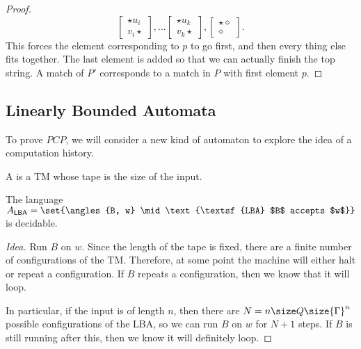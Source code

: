 \documentclass{standalone}
\begin{document}
\begin{proof}
\[{      \begin{bmatrix} \star u_i \\ v_i \star \end{bmatrix}, \dots
      \begin{bmatrix} \star u_k \\ v_k \star \end{bmatrix},
      \begin{bmatrix} \star \diamond \\ \diamond \end{bmatrix}
    }.
  \]
  This forces the element corresponding to \(p\) to go first,
  and then every thing else fits together.
  The last element is added so that we can actually finish the top string.
  A match of \(P'\) corresponds to a match in \(P\) with first element \(p\).
\end{proof}

\subsection{Linearly Bounded Automata}
To prove \(\mathit{PCP}\), we will consider a new kind of automaton
to explore the idea of a computation history.
\begin{definition}
  A  is
  a \textsf{TM} whose tape is the size of the input.
\end{definition}
\begin{proposition}
  The language
  \(A_{\textsf{LBA}} = \set{\angles{B, w} \mid
                            \text{\textsf{LBA} $B$ accepts $w$}}\)
  is decidable.
\end{proposition}
\begin{proof}[Idea]
  Run \(B\) on \(w\).
  Since the length of the tape is fixed,
  there are a finite number of configurations of the \textsf{TM}.
  Therefore, at some point the machine will either
  halt or repeat a configuration.
  If \(B\) repeats a configuration, then we know that it will loop.

  In particular, if the input is of length \(n\),
  then there are \(N = n \size Q \size{\Gamma}^n\) possible configurations
  of the \textsf{LBA}, so we can run \(B\) on \(w\) for \(N + 1\) steps.
  If \(B\) is still running after this, then we know it will definitely loop.
\end{proof}
\end{document}
